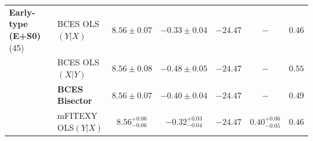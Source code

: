 \documentclass[preprint2]{emulateapj}
\begin{document}
\begin{table}
\begin{tabular}{llccccc}
%
%
{\bf Early-type (E+S0)} (45) & BCES OLS$(Y|X)$    & $8.56 \pm 0.07$ & $-0.33 \pm 0.04$ & $-24.47$ & $-$    & $0.46$ \\
                             & BCES OLS$(X|Y)$    & $8.56 \pm 0.08$ & $-0.48 \pm 0.05$ & $-24.47$ & $-$    & $0.55$ \\
                             & {\bf BCES Bisector}& $\boldsymbol{8.56 \pm 0.07}$ & $\boldsymbol{-0.40 \pm 0.04}$ & $\boldsymbol{-24.47}$ & $-$    & $\boldsymbol{0.49}$ \\
                             & mFITEXY OLS$(Y|X)$ & $8.56^{+0.06}_{-0.06}$ & $-0.32^{+0.03}_{-0.04}$ & $-24.47$ & $0.40^{+0.06}_{-0.05}$ & $0.46$ \\

\end{tabular}
\end{table}
\end{document}
